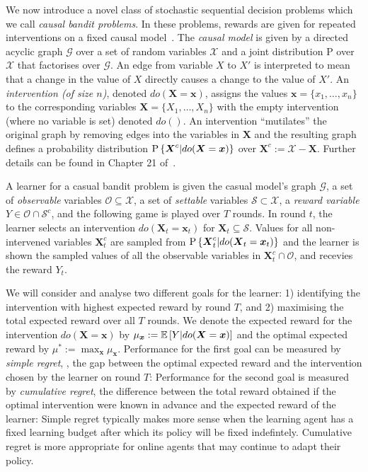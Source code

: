 \newcommand{\bernoulli}{\operatorname{Bernoulli}}
\newcommand{\dirac}{\operatorname{Dirac}}
\renewcommand{\vec}[1]{\boldsymbol{#1}}

We now introduce a novel class of stochastic sequential decision problems which we call \emph{causal bandit problems}. In these problems, rewards are given for repeated interventions on a fixed causal model~\cite{Pearl2000}. 
The \emph{causal model} is given by a directed acyclic graph $\mathcal{G}$ over a set of random variables $\mathcal{X}$ and a joint distribution $\mathrm{P}$ over $\mathcal{X}$ that factorises over $\mathcal{G}$. An edge from variable $X$ to $X'$ is interpreted to mean that a change in the value of $X$ directly causes a change to the value of $X'$. 
An \emph{intervention (of size $n$)}, denoted $do(\vec{X}=\vec{x})$, assigns the values $\vec{x}=\{x_1, \ldots, x_n\}$ to the corresponding variables $\vec{X}=\{X_1, \ldots, X_n\}$ with the empty intervention (where no variable is set) denoted $do()$.
An intervention ``mutilates'' the original graph by removing edges into the variables in $\vec{X}$ and the resulting graph defines a probability distribution $\P{\vec{X}^c | do(\vec{X}=\vec{x})}$ over $\vec{X}^c := \mathcal{X} - \vec{X}$. 
Further details can be found in Chapter 21 of~\cite{Koller2009}.

A learner for a casual bandit problem is given the casual model's graph $\mathcal{G}$, a set of \emph{observable} variables $\mathcal{O} \subseteq \mathcal{X}$, a set of \emph{settable} variables $\mathcal{S} \subset \mathcal{X}$, a \emph{reward variable} $Y \in \mathcal{O} \cap \mathcal{S}^c$, and the following game is played over $T$ rounds. 
In round $t$, the learner selects an intervention $do(\vec{X}_t = \vec{x}_t)$ for $\vec{X}_t \subseteq \mathcal{S}$. 
Values for all non-intervened variables $\vec{X}^c_t$ are sampled from $\P{\vec{X}^c_t | do(\vec{X}_t = \vec{x}_t)}$ and the learner is shown the sampled values of all the observable variables in $\vec{X}^c_t \cap \mathcal{O}$, and recevies the reward $Y_t$.

We will consider and analyse two different goals for the learner: 1) identifying the intervention with highest expected reward by round $T$, and 2) maximising the total expected reward over all $T$ rounds. 
We denote the expected reward for the intervention $do(\vec{X} = \vec{x})$ by $\mu_{\vec{x}} := \E{Y | do(\vec{X} = \vec{x})}$ and the optimal expected reward by $\mu^* := \max_{\vec{x}} \mu_{\vec{x}}$.
Performance for the first goal can be measured by \emph{simple regret}, \ie, the gap between the optimal expected reward and the intervention chosen by the learner on round $T$:
\eqn{
\label{eq:regret-simple}
\simpleregret = \mu^* - \E{\mu_{\vec{x}_T}}\,.
}
Performance for the second goal is measured by \emph{cumulative regret}, the difference between the total reward obtained if the optimal intervention were known in advance and the expected reward of the learner:
Simple regret typically makes more sense when the learning agent has a fixed learning budget after which its policy will be fixed indefintely. Cumulative
regret is more appropriate for online agents that may continue to adapt their policy.

